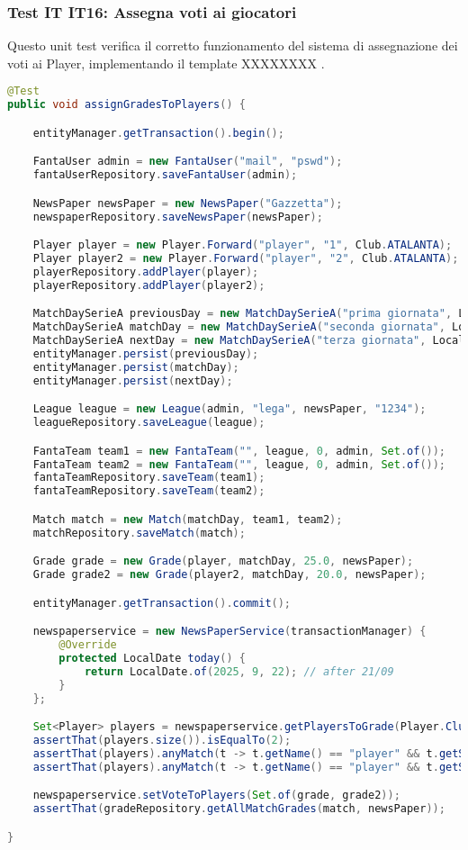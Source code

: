 \subsubsection{Test IT IT16: Assegna voti ai giocatori} \label{IT16}

Questo unit test verifica il corretto funzionamento del sistema di assegnazione dei voti ai Player,
implementando il template XXXXXXXX .

\begin{lstlisting}[language=Java]
@Test
public void assignGradesToPlayers() {

	entityManager.getTransaction().begin();

    FantaUser admin = new FantaUser("mail", "pswd");
	fantaUserRepository.saveFantaUser(admin);

	NewsPaper newsPaper = new NewsPaper("Gazzetta");
	newspaperRepository.saveNewsPaper(newsPaper);

	Player player = new Player.Forward("player", "1", Club.ATALANTA);
	Player player2 = new Player.Forward("player", "2", Club.ATALANTA);
	playerRepository.addPlayer(player);
	playerRepository.addPlayer(player2);

	MatchDaySerieA previousDay = new MatchDaySerieA("prima giornata", LocalDate.of(2020, 1, 13));
	MatchDaySerieA matchDay = new MatchDaySerieA("seconda giornata", LocalDate.of(2025, 9, 20));
	MatchDaySerieA nextDay = new MatchDaySerieA("terza giornata", LocalDate.of(2020, 1, 26));
	entityManager.persist(previousDay);
	entityManager.persist(matchDay);
	entityManager.persist(nextDay);

	League league = new League(admin, "lega", newsPaper, "1234");
	leagueRepository.saveLeague(league);

	FantaTeam team1 = new FantaTeam("", league, 0, admin, Set.of());
	FantaTeam team2 = new FantaTeam("", league, 0, admin, Set.of());
	fantaTeamRepository.saveTeam(team1);
	fantaTeamRepository.saveTeam(team2);

	Match match = new Match(matchDay, team1, team2);
	matchRepository.saveMatch(match);

	Grade grade = new Grade(player, matchDay, 25.0, newsPaper);
	Grade grade2 = new Grade(player2, matchDay, 20.0, newsPaper);

	entityManager.getTransaction().commit();

    newspaperservice = new NewsPaperService(transactionManager) {
		@Override
		protected LocalDate today() {
			return LocalDate.of(2025, 9, 22); // after 21/09
		}
	};

	Set<Player> players = newspaperservice.getPlayersToGrade(Player.Club.ATALANTA);
	assertThat(players.size()).isEqualTo(2);
	assertThat(players).anyMatch(t -> t.getName() == "player" && t.getSurname() == "1");
	assertThat(players).anyMatch(t -> t.getName() == "player" && t.getSurname() == "2");

	newspaperservice.setVoteToPlayers(Set.of(grade, grade2));
	assertThat(gradeRepository.getAllMatchGrades(match, newsPaper));

}
\end{lstlisting}

